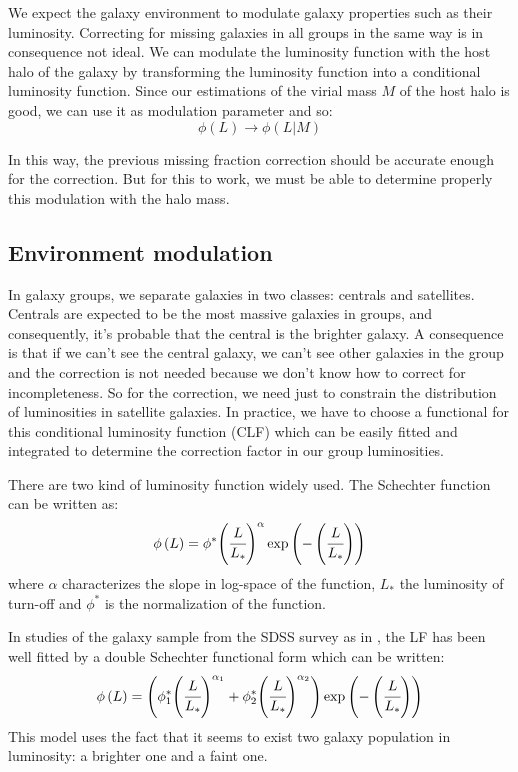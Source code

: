 We expect the galaxy environment to modulate galaxy properties such as their
luminosity. Correcting for missing galaxies in all groups in the same way is in
consequence not ideal. We can modulate the luminosity function with the host
halo of the galaxy by transforming the luminosity function into a conditional
luminosity function. Since our estimations of the virial mass $M$ of the host
halo is good, we can use it as modulation parameter and so:
%
\begin{equation}
    \phi\left(L\right)\rightarrow\phi\left(L|M\right)
\end{equation}

In this way, the previous missing fraction correction should be accurate enough
for the correction. But for this to work, we must be able to determine properly
this modulation with the halo mass.

\subsection{Environment modulation}

In galaxy groups, we separate galaxies in two classes: centrals and satellites.
Centrals are expected to be the most massive galaxies in groups, and
consequently, it's probable that the central is the brighter galaxy. A
consequence is that if we can't see the central galaxy, we can't see other
galaxies in the group and the correction is not needed because we don't know
how to correct for incompleteness. So for the correction, we need just to
constrain the distribution of luminosities in satellite galaxies. In practice,
we have to choose a functional for this conditional luminosity function (CLF)
which can be easily fitted and integrated to determine the correction factor in
our group luminosities.

There are two kind of luminosity function widely used. The Schechter function
can be written as:
%
\begin{equation}
    \phi\left(L\right)=\phi^*{\left(\cfrac{L}{L_*}\right)}^\alpha
    \exp\left(-\left(\cfrac{L}{L_*}\right)\right)
\end{equation}
%
where $\alpha$ characterizes the slope in log-space of the function, $L_*$ the
luminosity of turn-off and $\phi^*$ is the normalization of the function.

In studies of the galaxy sample from the SDSS survey as in \citet{Blanton+05},
the LF has been well fitted by a double Schechter functional form which can be
written:
%
\begin{equation}\label{eq:dblsch}
    \phi\left(L\right)=
    \left(\phi_1^*{\left(\cfrac{L}{L_*}\right)}^{\alpha_1}+
    \phi_2^*{\left(\cfrac{L}{L_*}\right)}^{\alpha_2}\right)
    \exp\left(-\left(\cfrac{L}{L_*}\right)\right)
\end{equation}
%
This model uses the fact that it seems to exist two galaxy population in
luminosity: a brighter one and a faint one.

